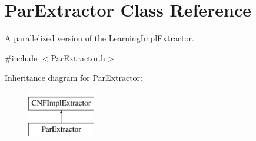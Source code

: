 \hypertarget{classParExtractor}{\section{Par\-Extractor Class Reference}
\label{classParExtractor}
}


A parallelized version of the \hyperlink{classLearningImplExtractor}{Learning\-Impl\-Extractor}.  




{\ttfamily \#include $<$Par\-Extractor.\-h$>$}

Inheritance diagram for Par\-Extractor\-:\begin{figure}[H]
\begin{center}
\leavevmode
\includegraphics[height=2.000000cm]{classParExtractor}
\end{center}
\end{figure}
